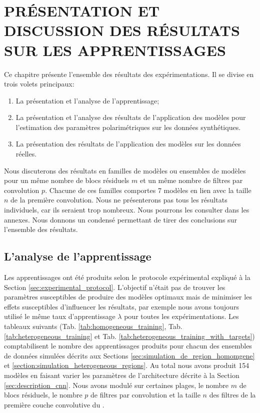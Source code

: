 \chapter{PRÉSENTATION ET DISCUSSION DES RÉSULTATS SUR LES APPRENTISSAGES}

Ce chapitre présente l'ensemble des résultats des expérimentations.  Il se divise en trois volets principaux:

\begin{enumerate}
    \item La présentation et l'analyse de l'apprentissage;
    \item La présentation et l'analyse des résultats de l'application des modèles pour l'estimation des paramètres polarimétriques sur les données synthétiques.
    \item La présentation des résultats de l'application des modèles sur les données réelles.
\end{enumerate}

Nous discuterons des résultats en familles de modèles ou ensembles de modèles pour un même nombre de blocs résiduels $m$ et un même nombre de filtres par convolution $p$.  Chacune de ces familles comportes 7 modèles en lien avec la taille $n$ de la première convolution. Nous ne présenterons pas tous les résultats individuels, car ils seraient trop nombreux. Nous pourrons les consulter dans les annexes.  Nous donnons un condensé permettant de tirer des conclusions sur l'ensemble des résultats.

\section{L'analyse de l'apprentissage}

Les apprentissages ont été produits selon le protocole expérimental expliqué à la Section \ref{sec:experimental_protocol}. L'objectif n'était pas de trouver les paramètres susceptibles de produire des modèles optimaux mais de minimiser les effets susceptibles d'influencer les résultats, par exemple nous avons toujours utilisé le même taux d'apprentissage $\lambda$ pour toutes les expérimentations. Les tableaux suivants (Tab.  \ref{tab:homogeneous_training}, Tab.  \ref{tab:heterogeneous_training} et Tab.  \ref{tab:heterogeneous_training_with_targets}) comptabilisent le nombre des apprentissages produits pour chacun des ensembles de données simulées décrits aux Sections \ref{sec:simulation_de_region_homomgene} et \ref{section:simulation_heterogeneous_regions}.  Au total nous avons produit 154 modèles en faisant varier les paramètres de l'architecture \acrconvnet décrite à la Section \ref{sec:description_cnn}.  Nous avons modulé sur certaines plages, le nombre $m$ de blocs résiduels, le nombre $p$ de filtres par convolution et la taille $n$  des filtres de la première couche convolutive du \acrconvnet.  

